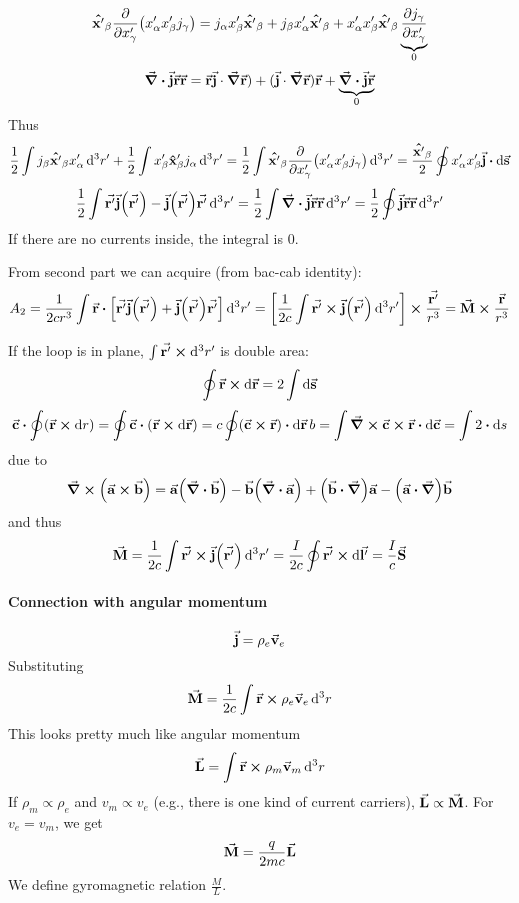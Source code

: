 $$\vu{x'}_\beta \pdv{x'_\gamma} \qty(x'_\alpha x'_\beta j_\gamma ) = j_\alpha x'_\beta \vu{x'}_\beta + j_\beta x'_\alpha \vu{x'}_\beta + x'_\alpha x'_\beta \vu{x'}_\beta \underbrace{\pdv{j_\gamma}{x'_\gamma}}_{0} $$
$$\div{\va{j}\va{r}\va{r}} = \va{r}\va{j}\cdot \grad{\va{r}}) + (\va{j}\cdot \grad{\va{r}})\va{r} + \underbrace{\div{\va{j}}\va{r}}_{0}$$
Thus
$$ \frac{1}{2} \int j_\beta \vu{x'}_\beta  x'_\alpha \dd[3]{r'} + \frac{1}{2} \int x'_\beta \vu{x}'_\beta j_\alpha \dd[3]{r'} =\frac{1}{2} \int \vu{x'}_\beta \pdv{x'_\gamma} \qty(x'_\alpha x'_\beta j_\gamma )  \dd[3]{r'} =  \frac{\vu{x'}_\beta}{2} \oint  x'_\alpha x'_\beta \va{j} \vdot \dd{\va{s}}$$
$$ \frac{1}{2}\int \va{r'} \va{j}\qty(\va{r'}) -\va{j}\qty(\va{r'})\va{r'}  \dd[3]{r'} = \frac{1}{2}\int \div{\va{j}\va{r}\va{r}} \dd[3]{r'} = \frac{1}{2} \oint \va{j}\va{r}\va{r} \dd[3]{r'}$$
If there are no currents inside, the integral is 0.

From second part we can acquire (from bac-cab identity):
$$A_2  = \frac{1}{2cr^3} \int \va{r} \vdot \qty[\va{r'} \va{j}\qty(\va{r'}) +\va{j}\qty(\va{r'})\va{r'}  ]\dd[3]{r'} = \qty[\frac{1}{2c} \int \va{r'} \cross \va{j}\qty(\va{r'}) \dd[3]{r'} ] \cross \frac{\va{r'}}{r^3} = \va{M} \cross \frac{\va{r}}{r^3}$$ 

If the loop is in plane,  $\int \va{r'} \cross \dd[3]{r'}$ is double area:
$$\oint \va{r} \cross \dd{\va{r}} = 2\int \dd{\va{s}}$$
$$\va{c} \vdot \oint (\va{r} \cross \dd{r}) = \oint \va{c} \vdot (\va{r} \cross \dd{\va{r}}) =c\oint (\va{c} \cross \va{r}) \vdot \dd{\va{r}}b= \int \curl{\va{c} \cross \va{r}} \vdot \dd{\va{c}} = \int 2 \vdot \dd{s}$$
due to
$$\curl(\va{a} \cross \va{b}) = \va{a} \qty(\div{\va{b}})-\va{b} \qty(\div{\va{a}}) + \qty(\va{b}\vdot \grad)\va{a} - \qty(\va{a}\vdot \grad)\va{b}$$
 and thus
$$\va{M} = \frac{1}{2c} \int \va{r'} \cross \va{j}\qty(\va{r'}) \dd[3]{r'} = \frac{I}{2c} \oint \va{r'} \cross \dd{\va{l'}} = \frac{I}{c} \va{S}$$

\paragraph{Connection with angular momentum}
$$\va{j} = \rho_e \va{v}_e$$
Substituting
$$\va{M} = \frac{1}{2c} \int \va{r} \cross \rho_e \va{v}_e \dd[3]{r}$$
This looks pretty much like angular momentum
$$\va{L} =  \int \va{r} \cross \rho_m \va{v}_m \dd[3]{r}$$
If $\rho_m \propto \rho_e$ and $v_m \propto v_e$ (e.g., there is one kind of current carriers), $\va{L}\propto \va{M}$. For $v_e=v_m$, we get
$$\va{M} = \frac{q}{2mc} \va{L}$$
We define gyromagnetic relation $\frac{M}{L}$.
